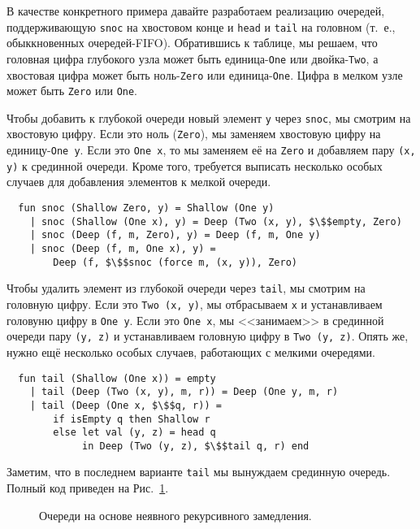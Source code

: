 В качестве конкретного примера давайте разработаем реализацию
очередей, поддерживающую \lstinline!snoc! на хвостовом конце и
\lstinline!head! и \lstinline!tail! на головном (т.~е., обыккновенных
очередей-FIFO). Обратившись к таблице, мы решаем, что головная цифра
глубокого узла может быть единица-\lstinline!One! или
двойка-\lstinline!Two!, а хвостовая цифра может быть
ноль-\lstinline!Zero! или единица-\lstinline!One!. Цифра в мелком узле
может быть \lstinline!Zero! или \lstinline!One!.

Чтобы добавить к глубокой очереди новый элемент \lstinline!y! через
\lstinline!snoc!, мы смотрим на хвостовую цифру. Если это ноль
(\lstinline!Zero!), мы заменяем хвостовую цифру на 
единицу-\lstinline!One y!. Если это \lstinline!One x!, то мы заменяем её на \lstinline!Zero!
и добавляем пару \lstinline!(x, y)! к срединной очереди. Кроме того,
требуется выписать несколько особых случаев для добавления элементов к
мелкой очереди.
\begin{lstlisting}
  fun snoc (Shallow Zero, y) = Shallow (One y)
    | snoc (Shallow (One x), y) = Deep (Two (x, y), $\$$empty, Zero)
    | snoc (Deep (f, m, Zero), y) = Deep (f, m, One y)
    | snoc (Deep (f, m, One x), y) = 
        Deep (f, $\$$snoc (force m, (x, y)), Zero)
\end{lstlisting}

Чтобы удалить элемент из глубокой очереди через
\lstinline!tail!, мы смотрим на головную цифру. Если это
\lstinline!Two (x, y)!, мы отбрасываем \lstinline!x! и устанавливаем
головуню цифру в \lstinline!One y!. Если это \lstinline!One x!, мы
<<занимаем>> в срединной очереди пару \lstinline!(y, z)! и
устанавливаем головную цифру в \lstinline!Two (y, z)!. Опять же, нужно
ещё несколько особых случаев, работающих с мелкими очередями.
\begin{lstlisting}
  fun tail (Shallow (One x)) = empty
    | tail (Deep (Two (x, y), m, r)) = Deep (One y, m, r)
    | tail (Deep (One x, $\$$q, r)) =
        if isEmpty q then Shallow r
        else let val (y, z) = head q
             in Deep (Two (y, z), $\$$tail q, r) end
\end{lstlisting}
Заметим, что в последнем варианте \lstinline!tail! мы вынуждаем
срединную очередь. Полный код приведен на Рис.~\ref{fig:11.1}.

\begin{figure}
  \centering
  
  \caption{Очереди на основе неявного рекурсивного замедления.}
  \label{fig:11.1}
\end{figure}

